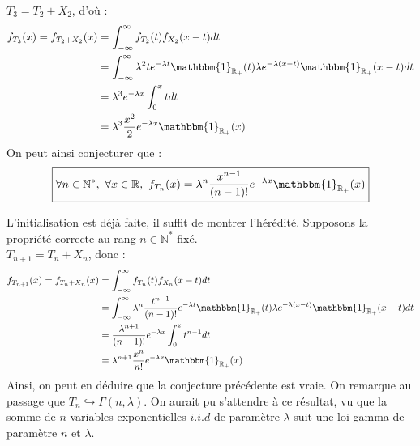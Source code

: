 \documentclass[a4paper, titlepage]{livret} %
\begin{document}
				$T_{3} = T_{2} + X_{2}$, d'où :
				\[\begin{aligned}
					f_{T_{3}}(x) = f_{T_{2} + X_{2}}(x) & = \int_{-\infty}^{\infty} f_{T_{2}}(t)f_{X_{2}}(x-t)dt\\
														& = \int_{-\infty}^{\infty} \lambda^{2} t e^{-\lambda t}\mathbbm{1}_{\mathbb{R}_{+}}(t)\lambda e^{-\lambda (x-t)}\mathbbm{1}_{\mathbb{R}_{+}}(x-t)dt\\
														& = \lambda^{3} e^{-\lambda x}\int_{0}^{x} t dt\\
														& = \lambda^{3} \frac{x^{2}}{2} e^{-\lambda x} \mathbbm{1}_{\mathbb{R}_{+}}(x)\\
				\end{aligned}\]
				On peut ainsi conjecturer que :
				\[\boxed{
					\forall n \in \mathbb{N}^{*}, \ \forall x \in \mathbb{R}, \ f_{T_{n}}(x) = \lambda^{n} \frac{x^{n-1}}{(n-1)!} e^{-\lambda x} \mathbbm{1}_{\mathbb{R}_{+}}(x)
				}\]

				L'initialisation est déjà faite, il suffit de montrer l'hérédité. Supposons la propriété correcte au rang $n \in \mathbb{N}^{*}$ fixé.\\
				$T_{n+1} = T_{n} + X_{n}$, donc :
				\[\begin{aligned}
					f_{T_{n+1}}(x) = f_{T_{n} + X_{n}}(x) & = \int_{-\infty}^{\infty} f_{T_{n}}(t)f_{X_{n}}(x-t)dt\\
														  & = \int_{-\infty}^{\infty} \lambda^{n} \frac{t^{n-1}}{(n-1)!} e^{-\lambda t}\mathbbm{1}_{\mathbb{R}_{+}}(t)\lambda e^{-\lambda (x-t)}\mathbbm{1}_{\mathbb{R}_{+}}(x-t)dt\\
														  & = \frac{\lambda^{n+1}}{(n-1)!} e^{-\lambda x}\int_{0}^{x} t^{n-1} dt\\
														  & = \lambda^{n+1} \frac{x^{n}}{n!} e^{-\lambda x} \mathbbm{1}_{\mathbb{R}_{+}}(x)\\
				\end{aligned}\]
				Ainsi, on peut en déduire que la conjecture précédente est vraie.
				On remarque au passage que $T_{n} \hookrightarrow \Gamma(n,\lambda)$.
				On aurait pu s'attendre à ce résultat, vu que la somme de $n$ variables exponentielles $i.i.d$ de paramètre $\lambda$ suit une loi gamma de paramètre $n$ et $\lambda$.
\end{document}
